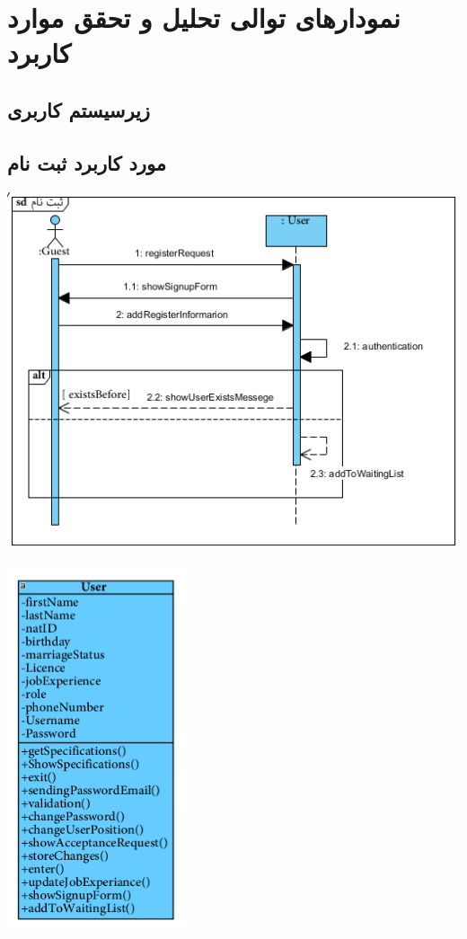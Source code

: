 
\newpage
\section{نمودارهای توالی تحلیل و تحقق موارد کاربرد}

\vspace{1cm}
\subsection{زیرسیستم کاربری}

\vspace{1cm}
\subsection*{مورد کاربرد ثبت نام}
\vspace{2cm}
\begin{center}
\includegraphics[width=\textwidth]{SequenceDiagrams/1.png}
\end{center}

\newpage
\vspace{2cm}
\begin{center}
\includegraphics[width=0.4\textwidth]{SequenceClasses/1.png}
\end{center}

